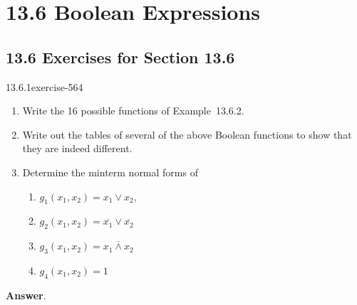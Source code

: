 \documentclass[twoside,10pt,]{book}
\numberwithin{equation}{section}
\begin{document}
\section*{13.6 Boolean Expressions}
\subsection*{13.6 Exercises for Section 13.6}
\begin{divisionsolution}{13.6.1}{}{exercise-564}%
\hypertarget{p-5014}{}%
\leavevmode%
\begin{enumerate}[label=(\alph*)]
\item\hypertarget{li-2268}{}\hypertarget{p-5015}{}%
Write the 16 possible functions of Example~13.6.2.%
\item\hypertarget{li-2269}{}\hypertarget{p-5016}{}%
Write out the tables of several of the above Boolean functions to show that they are indeed different.%
\item\hypertarget{li-2270}{}\hypertarget{p-5017}{}%
Determine the minterm normal forms of%
\begin{enumerate}[label=(\roman*)]
\item\hypertarget{li-2271}{}\hypertarget{p-5018}{}%
\(g_1\left(x_1, x_2\right)=x_1\lor x_2,\)%
\item\hypertarget{li-2272}{}\hypertarget{p-5019}{}%
\(g_2\left(x_1, x_2\right)=\overline{x_1}\lor \overline{x_2}\)%
\item\hypertarget{li-2273}{}\hypertarget{p-5020}{}%
\(g_3\left(x_1, x_2\right)=\overline{x_1 \land x_2}\)%
\item\hypertarget{li-2274}{}\hypertarget{p-5021}{}%
\(g_4\left(x_1, x_2\right)=1\)%
\end{enumerate}
%
\end{enumerate}
%
\par\smallskip%
\noindent\textbf{Answer}.\quad%
\hypertarget{p-5022}{}%
\leavevmode%
\end{divisionsolution}
\end{document}
